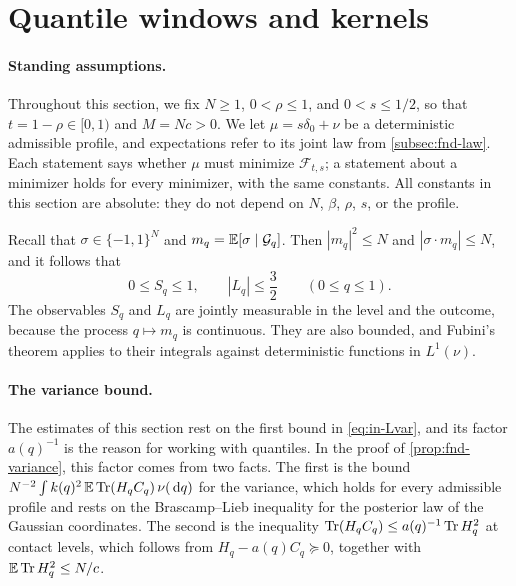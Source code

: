 \section{Quantile windows and kernels}\label{sec:wi-setup}

\paragraph{Standing assumptions.}
Throughout this section, we fix $N\ge1$, $0<\rho\le1$, and $0<s\le1/2$,
so that $t=1-\rho\in[0,1)$ and $M=Nc>0$. We let $\mu=s\delta_0+\nu$ be a
deterministic admissible profile, and expectations refer to its joint
law from \cref{subsec:fnd-law}. Each statement says whether $\mu$ must
minimize $\mathcal F_{t,s}$; a statement about a minimizer holds for
every minimizer, with the same constants. All constants in this section
are absolute: they do not depend on $N$, $\beta$, $\rho$, $s$, or the
profile.

Recall that $\sigma\in\{-1,1\}^N$ and $m_q=\mathbb E[\sigma\mid\mathcal G_q]$. Then
$|m_q|^2\le N$ and $|\sigma\cdot m_q|\le N$, and it follows that
\[
 0\le S_q\le1,\qquad |L_q|\le\frac32\qquad(0\le q\le1).
\]
The observables $S_q$ and $L_q$ are jointly measurable in the level and
the outcome, because the process $q\mapsto m_q$ is continuous. They are
also bounded, and Fubini's theorem applies to their integrals against deterministic
functions in $L^1(\nu)$.

\paragraph{The variance bound.}
The estimates of this section rest on the first bound in
\eqref{eq:in-Lvar}, and its factor $a(q)^{-1}$ is the reason for
working with quantiles. In the proof of \cref{prop:fnd-variance}, this
factor comes from two facts. The first is the bound
$N^{-2}\int k(q)^2\,\mathbb E\operatorname{Tr}(H_qC_q)\,\nu(\,\mathrm d q)$ for the variance, which
holds for every admissible profile \cite[Proposition~2.2, (2.15)]{AL}
and rests on the Brascamp--Lieb inequality for the posterior law of the
Gaussian coordinates. The second is the inequality
$\operatorname{Tr}(H_qC_q)\le a(q)^{-1}\operatorname{Tr} H_q^2$ at contact levels, which follows
from $H_q-a(q)C_q\succeq0$, together with $\mathbb E\operatorname{Tr} H_q^2\le N/c$.

